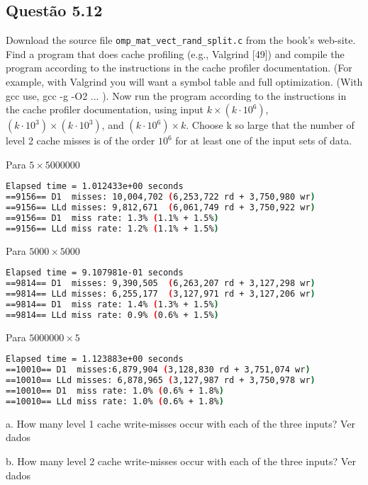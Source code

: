 
\subsection{Questão 5.12}

Download the source file \texttt{omp\_mat\_vect\_rand\_split.c} from the book’s web-site. Find a program that does cache profiling (e.g., Valgrind [49]) and compile the program according to the instructions in the cache profiler documentation. (For example, with Valgrind you will want a symbol table and full optimization. (With gcc use, gcc -g -O2 ... ). Now run the  program according to the instructions in the cache profiler documentation, using input $k \times (k \cdot 10^{6} )$, $(k \cdot 10^{3} ) \times (k \cdot 10^{3})$, and $(k \cdot 10^{6} ) \times k$. Choose k so large that the number of level 2 cache misses is of the order $10^{6}$ for at least one of the input sets of data.

Para $5 \times 5000000$
\begin{lstlisting}[language=bash]
Elapsed time = 1.012433e+00 seconds
==9156== D1  misses: 10,004,702 (6,253,722 rd + 3,750,980 wr)
==9156== LLd misses: 9,812,671  (6,061,749 rd + 3,750,922 wr)
==9156== D1  miss rate: 1.3% (1.1% + 1.5%)
==9156== LLd miss rate: 1.2% (1.1% + 1.5%)
\end{lstlisting}

Para $5000 \times 5000$
\begin{lstlisting}[language=bash]
Elapsed time = 9.107981e-01 seconds
==9814== D1  misses: 9,390,505  (6,263,207 rd + 3,127,298 wr)
==9814== LLd misses: 6,255,177  (3,127,971 rd + 3,127,206 wr)
==9814== D1  miss rate: 1.4% (1.3% + 1.5%)
==9814== LLd miss rate: 0.9% (0.6% + 1.5%)
\end{lstlisting}

Para $5000000 \times 5$
\begin{lstlisting}[language=bash]
Elapsed time = 1.123883e+00 seconds
==10010== D1  misses:6,879,904 (3,128,830 rd + 3,751,074 wr)
==10010== LLd misses: 6,878,965 (3,127,987 rd + 3,750,978 wr)
==10010== D1  miss rate: 1.0% (0.6% + 1.8%)
==10010== LLd miss rate: 1.0% (0.6% + 1.8%)
\end{lstlisting}


a. How many level 1 cache write-misses occur with each of the three inputs? Ver dados

b. How many level 2 cache write-misses occur with each of the three inputs? Ver dados

